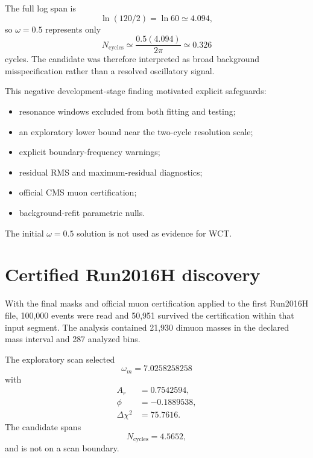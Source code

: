 \documentclass[11pt]{article}
\begin{document}
The full log span is
\begin{equation}
\ln(120/2)=\ln 60\simeq4.094,
\end{equation}
so \(\omega=0.5\) represents only
\begin{equation}
N_{\mathrm{cycles}}
\simeq
\frac{0.5(4.094)}{2\pi}
\simeq0.326
\end{equation}
cycles.  The candidate was therefore interpreted as broad background
misspecification rather than a resolved oscillatory signal.

This negative development-stage finding motivated explicit safeguards:
\begin{itemize}
    \item resonance windows excluded from both fitting and testing;
    \item an exploratory lower bound near the two-cycle resolution scale;
    \item explicit boundary-frequency warnings;
    \item residual RMS and maximum-residual diagnostics;
    \item official CMS muon certification;
    \item background-refit parametric nulls.
\end{itemize}

The initial \(\omega=0.5\) solution is not used as evidence for WCT.

\section{Certified Run2016H discovery}

With the final masks and official muon certification applied to the first
Run2016H file, 100,000 events were read and 50,951 survived the certification
within that input segment.  The analysis contained 21,930 dimuon masses in the
declared mass interval and 287 analyzed bins.

The exploratory scan selected
\begin{equation}
\boxed{
\omega_m=7.0258258258
}
\label{eq:frozenomega}
\end{equation}
with
\begin{align}
A_r &= 0.7542594,\\
\phi &= -0.1889538,\\
\Delta\chi^2 &= 75.7616.
\end{align}
The candidate spans
\begin{equation}
N_{\mathrm{cycles}}=4.5652,
\end{equation}
and is not on a scan boundary.
\end{document}
